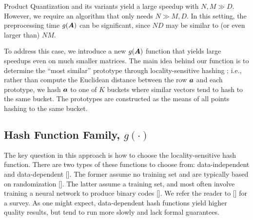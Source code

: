 

Product Quantization and its variants yield a large speedup with $N, M \gg D$. However, we require an algorithm that only needs $N \gg M, D$. In this setting, the preprocessing time $g(\bm{A})$ can be significant, since $ND$ may be similar to (or even larger than) $NM$.

To address this case, we introduce a new $g(\bm{A})$ function that yields large speedups even on much smaller matrices. %
The main idea behind our function is to determine the ``most similar'' prototype through locality-sensitive hashing \cite{lsh}; i.e., rather than compute the Euclidean distance between the row $\bm{a}$ and each prototype, we hash $\bm{a}$ to one of $K$ buckets where similar vectors tend to hash to the same bucket. The prototypes are constructed as the means of all points hashing to the same bucket.


\subsection{Hash Function Family, $g(\cdot)$}

The key question in this approach is how to choose the locality-sensitive hash function. %
There are two types of these functions to choose from: data-independent and data-dependent []. The former assume no training set and are typically based on randomization []. The latter assume a training set, and most often involve training a neural network to produce binary codes []. We refer the reader to [] for a survey. As one might expect, data-dependent hash functions yield higher quality results, but tend to run more slowly and lack formal guarantees.

